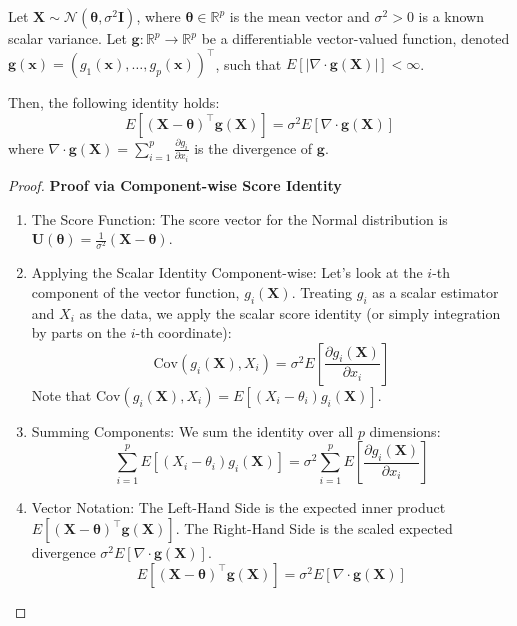 \documentclass[
  letterpaper,
  DIV=11,
  numbers=noendperiod]{scrreprt}
\providecommand{\tightlist}{%
  \setlength{\itemsep}{0pt}\setlength{\parskip}{0pt}}
\renewcommand{\[}{\begin{equation}}
\renewcommand{\]}{\end{equation}}
\theoremstyle{definition}
\theoremstyle{plain}
\theoremstyle{plain}
\theoremstyle{plain}
\theoremstyle{definition}
\theoremstyle{plain}
\theoremstyle{remark}
\begin{document}
Let
\(\mathbf{X} \sim \mathcal{N}(\boldsymbol{\theta}, \sigma^2 \mathbf{I})\),
where \(\boldsymbol{\theta} \in \mathbb{R}^p\) is the mean vector and
\(\sigma^2 > 0\) is a known scalar variance. Let
\(\mathbf{g}: \mathbb{R}^p \to \mathbb{R}^p\) be a differentiable
vector-valued function, denoted
\(\mathbf{g}(\mathbf{x}) = (g_1(\mathbf{x}), \dots, g_p(\mathbf{x}))^\top\),
such that \(E[| \nabla \cdot \mathbf{g}(\mathbf{X}) |] < \infty\).

Then, the following identity holds: \[
E \left[ (\mathbf{X} - \boldsymbol{\theta})^\top \mathbf{g}(\mathbf{X}) \right] = \sigma^2 E \left[ \nabla \cdot \mathbf{g}(\mathbf{X}) \right]
\] where
\(\nabla \cdot \mathbf{g}(\mathbf{X}) = \sum_{i=1}^p \frac{\partial g_i}{\partial x_i}\)
is the divergence of \(\mathbf{g}\).

\begin{proof}
\textbf{Proof via Component-wise Score Identity}

\begin{enumerate}
\def\labelenumi{\arabic{enumi}.}
\tightlist
\item
  The Score Function: The score vector for the Normal distribution is
  \(\mathbf{U}(\boldsymbol{\theta}) = \frac{1}{\sigma^2}(\mathbf{X} - \boldsymbol{\theta})\).
\item
  Applying the Scalar Identity Component-wise: Let's look at the
  \(i\)-th component of the vector function, \(g_i(\mathbf{X})\).
  Treating \(g_i\) as a scalar estimator and \(X_i\) as the data, we
  apply the scalar score identity (or simply integration by parts on the
  \(i\)-th coordinate): \[
  \text{Cov}(g_i(\mathbf{X}), X_i) = \sigma^2 E \left[ \frac{\partial g_i(\mathbf{X})}{\partial x_i} \right]
  \] Note that
  \(\text{Cov}(g_i(\mathbf{X}), X_i) = E[(X_i - \theta_i) g_i(\mathbf{X})]\).
\item
  Summing Components: We sum the identity over all \(p\) dimensions: \[
  \sum_{i=1}^p E \left[ (X_i - \theta_i) g_i(\mathbf{X}) \right] = \sigma^2 \sum_{i=1}^p E \left[ \frac{\partial g_i(\mathbf{X})}{\partial x_i} \right]
  \]
\item
  Vector Notation: The Left-Hand Side is the expected inner product
  \(E[(\mathbf{X} - \boldsymbol{\theta})^\top \mathbf{g}(\mathbf{X})]\).
  The Right-Hand Side is the scaled expected divergence
  \(\sigma^2 E[\nabla \cdot \mathbf{g}(\mathbf{X})]\). \[
  E \left[ (\mathbf{X} - \boldsymbol{\theta})^\top \mathbf{g}(\mathbf{X}) \right] = \sigma^2 E \left[ \nabla \cdot \mathbf{g}(\mathbf{X}) \right]
  \]
\end{enumerate}

\end{proof}
\end{document}
